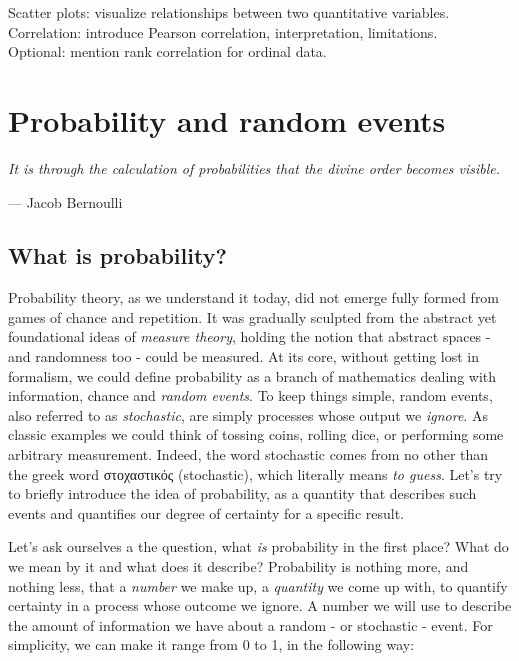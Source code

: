 \documentclass{book}
\begin{document}
Scatter plots: visualize relationships between two quantitative variables.\\

Correlation: introduce Pearson correlation, interpretation, limitations.\\

Optional: mention rank correlation for ordinal data.\\



\chapter{Probability and random events}

\epigraph{\textit{It is through the calculation of probabilities that the divine order becomes visible.}}{— Jacob Bernoulli}

\section{What is probability?}

Probability theory, as we understand it today, did not emerge fully formed from games of chance and repetition. It was gradually sculpted from the abstract yet foundational ideas of \textit{measure theory}, holding the notion that abstract spaces - and randomness too - could be measured. At its core, without getting lost in formalism, we could define probability as a branch of mathematics dealing with information, chance and \textit{random events}. To keep things simple, random events, also referred to as \textit{stochastic}, are simply processes whose output we \textit{ignore}. As classic examples we could think of tossing coins, rolling dice, or performing some arbitrary measurement. Indeed, the word stochastic comes from no other than the greek word \textgreek{στοχαστικός} (stochastic), which literally means \textit{to guess}. Let's try to briefly introduce the idea of probability, as a quantity that describes such events and quantifies our degree of certainty for a specific result.

\medskip

Let's ask ourselves a the question, what \textit{is} probability in the first place? What do we mean by it and what does it describe? Probability is nothing more, and nothing less, that a \textit{number} we make up, a \textit{quantity} we come up with, to quantify certainty in a process whose outcome we ignore. A number we will use to describe the amount of information we have about a random - or stochastic - event. For simplicity, we can make it range from 0 to 1, in the following way:
\end{document}
